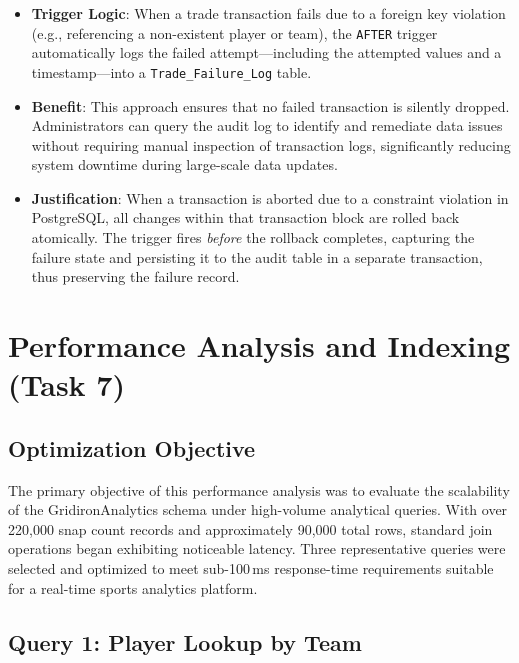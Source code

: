 \documentclass[conference]{IEEEtran}
\begin{document}
\begin{itemize}
  \item \textbf{Trigger Logic}: When a trade transaction fails due to a foreign key violation (e.g., referencing a non-existent player or team), the \texttt{AFTER} trigger automatically logs the failed attempt—including the attempted values and a timestamp—into a \texttt{Trade\_Failure\_Log} table.
  \item \textbf{Benefit}: This approach ensures that no failed transaction is silently dropped. Administrators can query the audit log to identify and remediate data issues without requiring manual inspection of transaction logs, significantly reducing system downtime during large-scale data updates.
  \item \textbf{Justification}: When a transaction is aborted due to a constraint violation in PostgreSQL, all changes within that transaction block are rolled back atomically. The trigger fires \textit{before} the rollback completes, capturing the failure state and persisting it to the audit table in a separate transaction, thus preserving the failure record.
\end{itemize}

\section{Performance Analysis and Indexing (Task 7)}

\subsection{Optimization Objective}

The primary objective of this performance analysis was to evaluate the scalability of the GridironAnalytics schema under high-volume analytical queries. With over 220{,}000 snap count records and approximately 90{,}000 total rows, standard join operations began exhibiting noticeable latency. Three representative queries were selected and optimized to meet sub-100\,ms response-time requirements suitable for a real-time sports analytics platform.

\subsection{Query 1: Player Lookup by Team}
\end{document}
